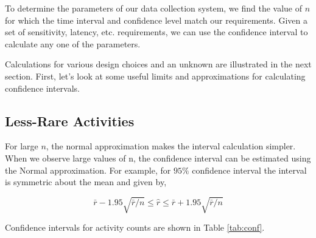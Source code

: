 \documentclass{article}
\begin{document}

To determine the parameters of our data collection system, we find the value of $n$ for which the time interval and confidence level match our requirements.  Given a set of sensitivity, latency, etc. requirements, we can use the confidence interval to calculate any one of the parameters. 

Calculations for various design choices and an unknown are illustrated in the next section.  First, let's look at some useful limits and approximations for calculating confidence intervals.

\subsection{Less-Rare Activities} %

For large $n$, the normal approximation makes the interval calculation simpler. When we observe large values of n, the confidence interval can be estimated using the Normal approximation. For example, for $95\%$ confidence interval the interval is symmetric about the mean and given by,

\begin{equation}
    \label{eq:largenconf}
    \bar{r} - 1.95 \sqrt{\bar{r}/n} \leq \hat{r} \leq \bar{r} + 1.95 \sqrt{\bar{r}/n}
\end{equation}

Confidence intervals for activity counts are shown in Table \ref{tab:conf}.
\end{document}
